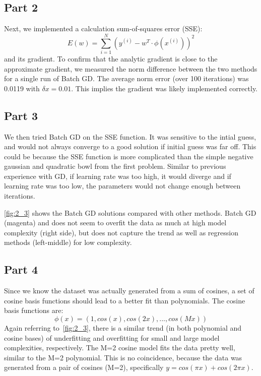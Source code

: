 \subsection{Part 2}
Next, we implemented a calculation sum-of-squares error (SSE):
\begin{equation}
E(w) = \sum_{i=1}^{N} (y^{(i)}-w^T\cdot \phi(x^{(i)}))^2
\end{equation}
and its gradient.
To confirm that the analytic gradient is close to the approximate gradient, we measured the norm difference between the two methods for a single run of Batch GD.
The average norm error (over 100 iterations) was 0.0119 with $\delta x = 0.01$.
This implies the gradient was likely implemented correctly.

\subsection{Part 3}
We then tried Batch GD on the SSE function.
It was sensitive to the intial guess, and would not always converge to a good solution if initial guess was far off.
This could be because the SSE function is more complicated than the simple negative gaussian and quadratic bowl from the first problem.
Similar to previous experience with GD, if learning rate was too high, it would diverge and if learning rate was too low, the parameters would not change enough between iterations.

\cref{fig:2_3} shows the Batch GD solutions compared with other methods.
Batch GD (magenta) and does not seem to overfit the data as much at high model complexity (right side), but does not capture the trend as well as regression methods (left-middle) for low complexity.


\subsection{Part 4}
Since we know the dataset was actually generated from a sum of cosines, a set of cosine basis functions should lead to a better fit than polynomials.
The cosine basis functions are:
\begin{equation}
	\phi(x)=(1, cos(x), cos(2x), ... , cos(Mx))
\end{equation}
Again referring to~\cref{fig:2_3}, there is a similar trend (in both polynomial and cosine bases) of underfitting and overfitting for small and large model complexities, respectively.
The M=2 cosine model fits the data pretty well, similar to the M=2 polynomial.
This is no coincidence, because the data was generated from a pair of cosines (M=2), specifically $y = cos(\pi x) + cos(2\pi x)$.

